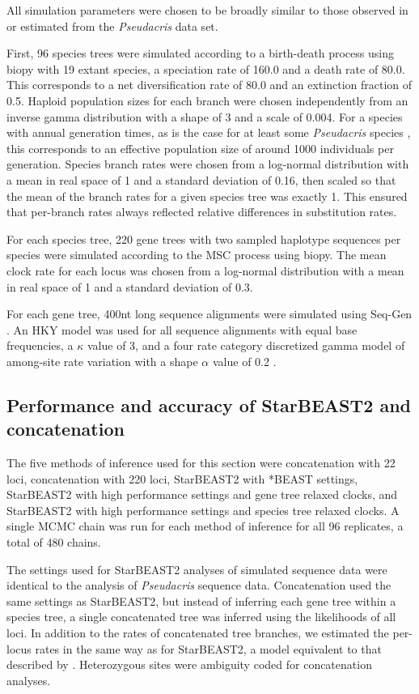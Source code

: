 \documentclass[nogrid]{MBE}%
\begin{document}
All simulation parameters were chosen to be broadly similar to those observed in
or estimated from the \textit{Pseudacris} data set.

First, 96 species trees were simulated according to a birth-death process
\citep{Gernhard2008769} using biopy with 19 extant species, a speciation rate of
160.0 and a death rate of 80.0. This corresponds to a net diversification rate
of 80.0 and an extinction fraction of 0.5. Haploid population sizes
for each branch were chosen independently from an inverse gamma distribution
with a shape of 3 and a scale of 0.004. For a species with annual generation
times, as is the case for at least some \textit{Pseudacris} species
\citep{10.2307/1446044}, this corresponds to an effective population size
of around 1000 individuals per generation. Species branch rates were chosen from a
log-normal distribution with a mean in real space of 1 and a standard
deviation of 0.16, then scaled so that the mean of the branch rates for a given
species tree was exactly 1. This ensured that per-branch rates always reflected
relative differences in substitution rates.

For each species tree, 220 gene trees with two sampled haplotype sequences per
species were simulated according to the MSC process using biopy. The mean clock
rate for each locus was chosen from a log-normal distribution with a mean in
real space of 1 and a standard deviation of 0.3.

For each gene tree, 400nt long sequence alignments were simulated using Seq-Gen
\citep{Rambaut01061997}. An HKY model was used for all sequence alignments with
equal base frequencies, a $\kappa$ value of 3, and a four rate category
discretized gamma model of among-site rate variation with a shape $\alpha$ value
of 0.2 \citep{Yang1994}.

\subsection{Performance and accuracy of StarBEAST2 and concatenation}

The five methods of inference used for this section were concatenation with 22
loci, concatenation with 220 loci, StarBEAST2 with *BEAST settings, StarBEAST2
with high performance settings and gene tree relaxed clocks, and StarBEAST2 with
high performance settings and species tree relaxed clocks. A single MCMC chain was
run for each method of inference for all 96 replicates, a total of 480 chains.

The settings used for StarBEAST2 analyses of simulated sequence data were
identical to the analysis of \textit{Pseudacris} sequence data. Concatenation
used the same settings as StarBEAST2, but instead of inferring each gene tree
within a species tree, a single concatenated tree was inferred using the
likelihoods of all loci. In addition to the rates of concatenated tree branches,
we estimated the per-locus rates in the same way as for StarBEAST2, a model
equivalent to that described by \cite{Rasmussen01122007}. Heterozygous sites
were ambiguity coded for concatenation analyses.
\end{document}
